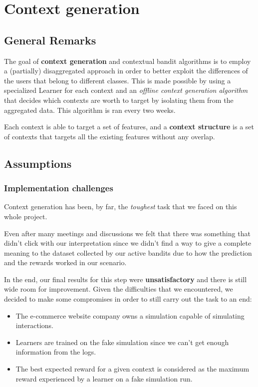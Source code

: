 \chapter{Context generation}
\label{chap:ctx_gen}

\section{General Remarks}
\label{sec:ctx_gen_remarks}

The goal of \textbf{context generation} and contextual bandit algorithms is to employ a (partially) disaggregated approach in order to better exploit the differences of the users that belong to different classes.
This is made possible by using a specialized Learner for each context and an \textit{offline context generation algorithm} that decides which contexts are worth to target by isolating them from the aggregated data.
This algorithm is ran every two weeks.

Each context is able to target a set of features, and a \textbf{context structure} is a set of contexts that targets all the existing features without any overlap.

\section{Assumptions}
\label{sec:ctx_gen_ass}

\subsection{Implementation challenges}

Context generation has been, by far, the \textit{toughest} task that we faced on this whole project.

Even after many meetings and discussions we felt that there was something that didn't click with our interpretation since we didn't find a way to give a complete meaning to the dataset collected by our active bandits due to how the prediction and the rewards worked in our scenario.

In the end, our final results for this step were \textbf{unsatisfactory} and there is still wide room for improvement.
Given the difficulties that we encountered, we decided to make some compromises in order to still carry out the task to an end:

\begin{itemize}
	\item The e-commerce website company owns a simulation capable of simulating interactions.
	\item Learners are trained on the fake simulation since we can't get enough information from the logs.
	\item The best expected reward for a given context is considered as the maximum reward experienced by a learner on a fake simulation run.
\end{itemize}

